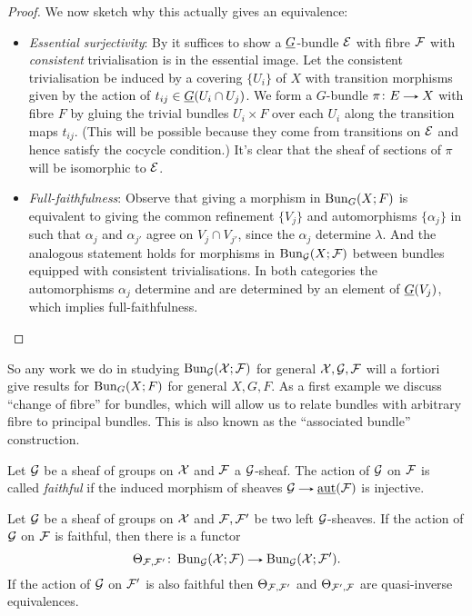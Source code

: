 \begin{proof}
  We now sketch why this actually gives an equivalence:
  \begin{itemize}
  \item \emph{Essential surjectivity}: By  it
    suffices to show a $\underline{G}$-bundle $\mathcal{E}$ with fibre $\mathcal{F}$ with
    \emph{consistent} trivialisation is in the essential image. Let
    the consistent trivialisation be induced by a covering $\{U_i\}$
    of $X$ with transition morphisms given by the action of $t_{ij}
    \in \underline{G}(U_i \cap U_j)$. We form a $G$-bundle $\pi \c E \to X$
    with fibre $F$ by gluing the trivial bundles $U_i \times F$ over
    each $U_i$ along the transition maps $t_{ij}$. (This will be
    possible because they come from transitions on $\mathcal{E}$ and hence
    satisfy the cocycle condition.)  It's clear that the sheaf of
    sections of $\pi$ will be isomorphic to $\mathcal{E}$.
  \item \emph{Full-faithfulness}: Observe that giving a morphism in
    $\operatorname{Bun}_G(X;F)$ is equivalent to giving the common refinement
    $\{V_j\}$ and automorphisms $\{\alpha_j\}$ in
     such that $\alpha_j$ and $\alpha_{j'}$
    agree on $V_j \cap V_{j'}$, since the $\alpha_j$ determine
    $\lambda$. And the analogous statement holds for morphisms in
    $\operatorname{Bun}_{\mathcal{G}}(X;\mathcal{F})$ between bundles equipped with consistent
    trivialisations. In both categories the automorphisms $\alpha_j$
    determine and are determined by an element of $\underline{G}(V_j)$, which
    implies full-faithfulness. \qedhere
  \end{itemize}
\end{proof}

So any work we do in studying $\operatorname{Bun}_{\mathcal{G}}(\mathcal{X};\mathcal{F})$ for general $\mathcal{X},\mathcal{G},\mathcal{F}$
will a fortiori give results for $\operatorname{Bun}_G(X;F)$ for general $X,G,F$. As
a first example we discuss ``change of fibre'' for bundles, which will
allow us to relate bundles with arbitrary fibre to principal
bundles. This is also known as the ``associated bundle'' construction.

\begin{definition}
  Let $\mathcal{G}$ be a sheaf of groups on $\mathcal{X}$ and $\mathcal{F}$ a $\mathcal{G}$-sheaf. The
  action of $\mathcal{G}$ on $\mathcal{F}$ is called \emph{faithful} if the induced
  morphism of sheaves $\G \to \saut(\F)$ is injective.
\end{definition}

\begin{proposition}
  Let $\mathcal{G}$ be a sheaf of groups on $\mathcal{X}$ and $\mathcal{F},\mathcal{F}'$ be two left
  $\mathcal{G}$-sheaves. If the action of $\mathcal{G}$ on $\mathcal{F}$ is faithful, then there
  is a functor
  \[
  \Theta_{\F,\F'} \c \Bun_\G(\X;\F) \to \Bun_\G(\X;\F').
  \]
  If the action of $\mathcal{G}$ on $\mathcal{F}'$ is also faithful then
  $\Theta_{\mathcal{F},\mathcal{F}'}$ and $\Theta_{\mathcal{F}',\mathcal{F}}$ are quasi-inverse
  equivalences.
\end{proposition}

